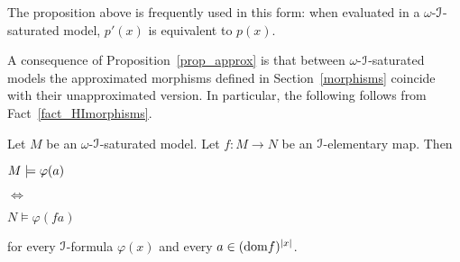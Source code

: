 \documentclass[10pt,oneside]{amsproc}
\begin{document}

\def\ceq#1#2#3{\parbox[t]{20ex}{$\displaystyle #1$}\parbox{5ex}{\hfil $#2$}{$\displaystyle #3$}}

\begin{remark}\label{remk_p'p}
  The proposition above is frequently used in this form: when evaluated in a $\omega$-${\EuScript I}$-saturated model, $p'(x)$ is equivalent to $p(x)$.
\end{remark}

A consequence of Proposition~\ref{prop_approx} is that between $\omega$-${\EuScript I}$-saturated models the approximated morphisms defined in Section~\ref{morphisms} coincide with their unapproximated version.
In particular, the following follows from Fact~\ref{fact_HImorphisms}.

\begin{corollary}\label{corol_omega_sat}
  Let $M$ be an $\omega$-${\EuScript I}$-saturated model.
  Let $f:M\to N$ be an ${\EuScript I}$-elementary map.
  Then

  \ceq{\hfill M\models\varphi(a)}{\Leftrightarrow}{N\models\varphi(fa)}

  for every ${\EuScript I}$-formula $\varphi(x)$ and every $a\in({\rm dom }f)^{|x|}$.
\end{corollary}  





  
\end{document}
